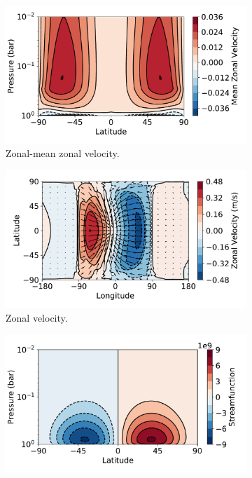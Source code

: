 \begin{figure}
  \centering
  \begin{subfigure}[t]{0.32\textwidth}
    \includegraphics[width=\textwidth]{figures/eqm-zonal-flow/tide_1_u.pdf}
    \caption{Zonal-mean zonal velocity.}
  \end{subfigure}
  \begin{subfigure}[t]{0.32\textwidth}
    \includegraphics[width=\textwidth]{figures/eqm-zonal-flow/tide_1_surf_ucomp.pdf}
    \caption{Zonal velocity.}
  \end{subfigure}
  \begin{subfigure}[t]{0.32\textwidth}
    \includegraphics[width=\textwidth]{figures/eqm-zonal-flow/sf_tide_day1.pdf}

\end{subfigure}
\end{figure}
